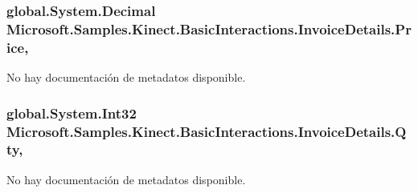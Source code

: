 \hypertarget{class_microsoft_1_1_samples_1_1_kinect_1_1_basic_interactions_1_1_invoice_details_a4f5305dcaefdf4f6c5d3625a7ff1fbcd}{
\subsubsection[{Price}]{\setlength{\rightskip}{0pt plus 5cm}global.\-System.\-Decimal Microsoft.\-Samples.\-Kinect.\-Basic\-Interactions.\-Invoice\-Details.\-Price\hspace{0.3cm}{\ttfamily [get]}, {\ttfamily [set]}}}\label{class_microsoft_1_1_samples_1_1_kinect_1_1_basic_interactions_1_1_invoice_details_a4f5305dcaefdf4f6c5d3625a7ff1fbcd}


No hay documentación de metadatos disponible. 

\hypertarget{class_microsoft_1_1_samples_1_1_kinect_1_1_basic_interactions_1_1_invoice_details_a7274f4ee3ff1cd9b20cca4bb53b1c0d9}{
\subsubsection[{Qty}]{\setlength{\rightskip}{0pt plus 5cm}global.\-System.\-Int32 Microsoft.\-Samples.\-Kinect.\-Basic\-Interactions.\-Invoice\-Details.\-Qty\hspace{0.3cm}{\ttfamily [get]}, {\ttfamily [set]}}}\label{class_microsoft_1_1_samples_1_1_kinect_1_1_basic_interactions_1_1_invoice_details_a7274f4ee3ff1cd9b20cca4bb53b1c0d9}


No hay documentación de metadatos disponible. 

